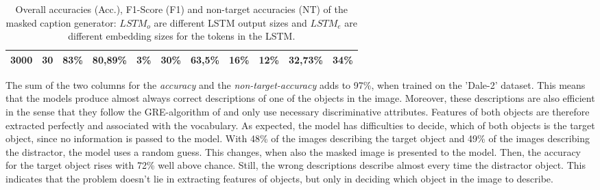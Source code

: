 \begin{table}[ht]
\begin{tabular}{cc|ccc|ccc|ccc}
        {3000}   & {30}     & {83\%}                              & {80,89\%}                           & {3\%}                                    & {30\%}        & {63,5\%}    & {16\%}      & {12\%}        & {32,73\%}   & {34\%}      \\
        \bottomrule
    \end{tabular}
    \caption{Overall accuracies (Acc.), F1-Score (F1) and non-target accuracies (NT) of the masked caption generator: $LSTM_o$ are different LSTM output sizes and $LSTM_e$ are different embedding sizes for the tokens in the LSTM.}
    \label{tab:results_masked-caption-generator}
\end{table}

The sum of the two columns for the \emph{accuracy} and the \emph{non-target-accuracy} adds to 97\%, when trained on the 'Dale-2' dataset.
This means that the models produce almost always correct descriptions of one of the objects in the image.
Moreover, these descriptions are also efficient in the sense that they follow the GRE-algorithm of \citet{Dale1995} and only use necessary discriminative attributes.
Features of both objects are therefore extracted perfectly and associated with the vocabulary.
As expected, the model has difficulties to decide, which of both objects is the target object, since no information is passed to the model.
With 48\% of the images describing the target object and 49\% of the images describing the distractor, the model uses a random guess.
This changes, when also the masked image is presented to the model.
Then, the accuracy for the target object rises with 72\% well above chance.
Still, the wrong descriptions describe almost every time the distractor object.
This indicates that the problem doesn't lie in extracting features of objects, but only in deciding which object in the image to describe.

